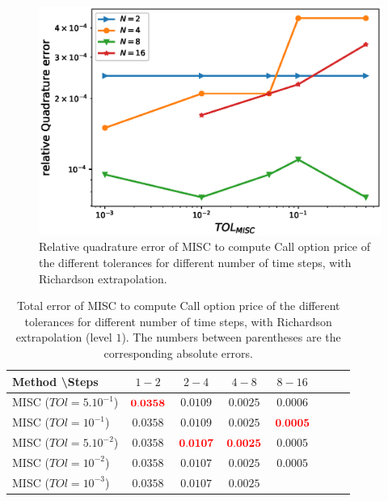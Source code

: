 \documentclass[11pt]{article}
\begin{document}
	\begin{figure}[h!]
\centering
\includegraphics[width=0.7\linewidth]{./figures/Call_MISC_quadrature_error/relative_quad_error_wrt_MISC_TOL_with_rich}


\caption{Relative quadrature error of MISC to compute Call option price of the different tolerances for different number of time steps, with Richardson extrapolation.}
\label{fig:Quadrature_error_with_rich_Call}
\end{figure}





\begin{table}[h!]
	\centering
	\begin{tabular}{l*{6}{c}r}
		Method \textbackslash  Steps            & $1-2$ & $2-4$ & $4-8$ & $8-16$  \\
		\hline
		MISC ($TOl=5.10^{-1}$)  &  $\mathbf{{\color{red}0.0358}}$ & $\mathbf{0.0109}$ & $\mathbf{0.0025}$ & $\mathbf{0.0006}$  \\
		MISC ($TOl=10^{-1}$)  &  $\mathbf{0.0358}$ & $\mathbf{0.0109}$ & $\mathbf{0.0025}$ & $\mathbf{{\color{red}0.0005}}$  \\
		MISC ($TOl=5.10^{-2}$) &  $\mathbf{0.0358}$ & $\mathbf{{\color{red}0.0107}}$ & $\mathbf{{\color{red}0.0025}}$ & $\mathbf{0.0005}$  \\
		MISC ($TOl=10^{-2}$)  &  $\mathbf{0.0358}$ & $\mathbf{0.0107}$ & $\mathbf{0.0025}$ & $\mathbf{0.0005}$ \\
		MISC ($TOl=10^{-3}$) &  $\mathbf{0.0358}$ & $\mathbf{0.0107}$ & $\mathbf{0.0025}$ & $\mathbf{}$  \\
		
		\hline
		\hline
	\end{tabular}
	\caption{Total error of MISC  to compute Call option price of the different tolerances for different number of time steps, with Richardson extrapolation (level $1$). The numbers between parentheses are the corresponding absolute errors.}
	\label{Total error of MISC and MC to compute Call option price of the different tolerances for different number of time steps, with Richardson extrapolation (level $1$). The numbers between parentheses are the corresponding absolute errors.}
\end{table}
\end{document}
